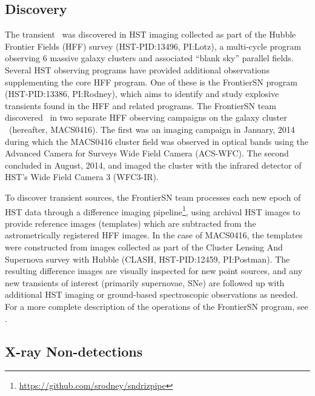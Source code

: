 \subsection{Discovery}\label{sec:Discovery}

The transient \spock\ was discovered in HST imaging collected as part
of the Hubble Frontier Fields (HFF) survey (HST-PID:13496, PI:Lotz), a
multi-cycle program observing 6 massive galaxy clusters and associated
``blank sky'' parallel fields.  Several HST observing programs have
provided additional observations supplementing the core HFF program.
One of these is the FrontierSN program (HST-PID:13386, PI:Rodney),
which aims to identify and study explosive transients found in the HFF
and related programs.  The FrontierSN team discovered \spock\ in two
separate HFF observing campaigns on the galaxy cluster
\ (hereafter, MACS0416).  The first was an imaging campaign
in January, 2014 during which the MACS0416 cluster field was observed
in optical bands using the Advanced Camera for Surveys Wide Field
Camera (ACS-WFC).  The second concluded in August, 2014, and imaged
the cluster with the infrared detector of HST's Wide Field Camera 3
(WFC3-IR).

To discover transient sources, the FrontierSN team processes each new
epoch of HST data through a difference imaging
pipeline\footnote{\url{https://github.com/srodney/sndrizpipe}}, using
archival HST images to provide reference images (templates) which are
subtracted from the astrometrically registered HFF images. In the case
of MACS0416, the templates were constructed from images collected as
part of the Cluster Lensing And Supernova survey with Hubble (CLASH,
HST-PID:12459, PI:Postman). The resulting difference images are
visually inspected for new point sources, and any new transients of
interest (primarily supernovae, SNe) are followed up with additional
HST imaging or ground-based spectroscopic observations as needed.  For
a more complete description of the operations of the FrontierSN
program, see \citet{Rodney:2015a}.

\subsection{X-ray Non-detections}

